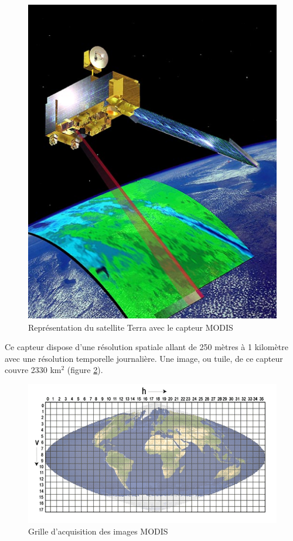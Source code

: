 \documentclass[10pt,a4paper]{article}
\begin{document}
\begin{figure}[!h]
\centering
\includegraphics[scale=0.4]{img/modis.png}
\caption{Représentation du satellite Terra avec le capteur MODIS}
\label{modis}
\end{figure}

Ce capteur dispose d'une résolution spatiale allant de 250 mètres à 1 kilomètre avec une résolution temporelle journalière. Une image, ou tuile, de ce capteur couvre 2330 km$^2$ (figure \ref{modisGrid}).

\begin{figure}[!h]
\centering
\includegraphics[scale=0.7]{img/modisGrid.png}
\caption{Grille d'acquisition des images MODIS}
\label{modisGrid}
\end{figure}
\end{document}
